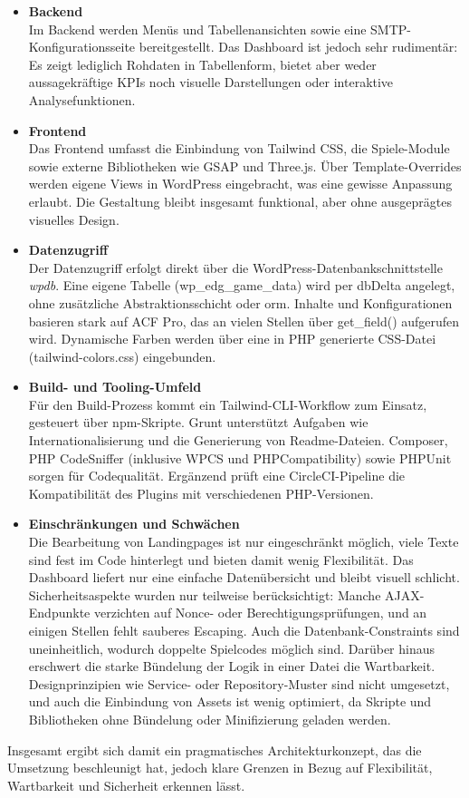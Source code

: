 \begin{itemize}
    \item \textbf{Backend}\\
    Im Backend werden Menüs und Tabellenansichten sowie eine SMTP-Konfigurationsseite bereitgestellt. Das Dashboard ist jedoch sehr rudimentär: Es zeigt lediglich Rohdaten in Tabellenform, bietet aber weder aussagekräftige KPIs noch visuelle Darstellungen oder interaktive Analysefunktionen.

    \item \textbf{Frontend}\\
    Das Frontend umfasst die Einbindung von Tailwind CSS, die Spiele-Module sowie externe Bibliotheken wie GSAP und Three.js. Über Template-Overrides werden eigene Views in WordPress eingebracht, was eine gewisse Anpassung erlaubt. Die Gestaltung bleibt insgesamt funktional, aber ohne ausgeprägtes visuelles Design.

    \item \textbf{Datenzugriff}\\
    Der Datenzugriff erfolgt direkt über die WordPress-Datenbankschnittstelle \emph{wpdb}. Eine eigene Tabelle (wp\_edg\_game\_data) wird per dbDelta angelegt, ohne zusätzliche Abstraktionsschicht oder \gls{orm}. Inhalte und Konfigurationen basieren stark auf ACF Pro, das an vielen Stellen über get\_field() aufgerufen wird. Dynamische Farben werden über eine in PHP generierte CSS-Datei (tailwind-colors.css) eingebunden.

    \item \textbf{Build- und Tooling-Umfeld}\\
    Für den Build-Prozess kommt ein Tailwind-CLI-Workflow zum Einsatz, gesteuert über npm-Skripte. Grunt unterstützt Aufgaben wie Internationalisierung und die Generierung von Readme-Dateien. Composer, PHP CodeSniffer (inklusive WPCS und PHPCompatibility) sowie PHPUnit sorgen für Codequalität. Ergänzend prüft eine CircleCI-Pipeline die Kompatibilität des Plugins mit verschiedenen PHP-Versionen.

    \item \textbf{Einschränkungen und Schwächen}\\
    Die Bearbeitung von Landingpages ist nur eingeschränkt möglich, viele Texte sind fest im Code hinterlegt und bieten damit wenig Flexibilität. Das Dashboard liefert nur eine einfache Datenübersicht und bleibt visuell schlicht. Sicherheitsaspekte wurden nur teilweise berücksichtigt: Manche AJAX-Endpunkte verzichten auf Nonce- oder Berechtigungsprüfungen, und an einigen Stellen fehlt sauberes Escaping. Auch die Datenbank-Constraints sind uneinheitlich, wodurch doppelte Spielcodes möglich sind. Darüber hinaus erschwert die starke Bündelung der Logik in einer Datei die Wartbarkeit. Designprinzipien wie Service- oder Repository-Muster sind nicht umgesetzt, und auch die Einbindung von Assets ist wenig optimiert, da Skripte und Bibliotheken ohne Bündelung oder Minifizierung geladen werden.
\end{itemize}
\vspace{0.5em}
Insgesamt ergibt sich damit ein pragmatisches Architekturkonzept, das die Umsetzung beschleunigt hat, jedoch klare Grenzen in Bezug auf Flexibilität, Wartbarkeit und Sicherheit erkennen lässt.


